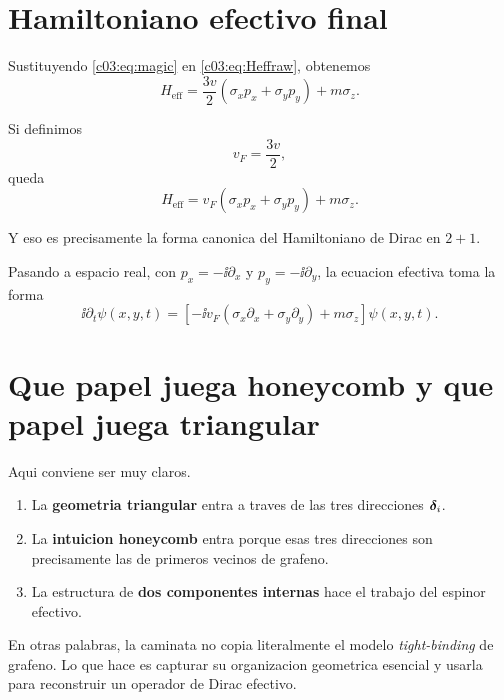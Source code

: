 \section{Hamiltoniano efectivo final}

Sustituyendo \eqref{c03:eq:magic} en \eqref{c03:eq:Heffraw}, obtenemos
\begin{equation}
H_{\text{eff}}
=
\frac{3v}{2}\left(\sigma_x p_x + \sigma_y p_y\right)+m\sigma_z.
\label{c03:eq:Hefffinal}
\end{equation}

Si definimos
\begin{equation}
v_F = \frac{3v}{2},
\end{equation}
queda
\begin{equation}
H_{\text{eff}}
=
v_F\left(\sigma_x p_x + \sigma_y p_y\right)+m\sigma_z.
\label{c03:eq:Diracfinal}
\end{equation}

Y eso es precisamente la forma canonica del Hamiltoniano de Dirac en \(2+1\).

Pasando a espacio real, con \(p_x=-\ii\partial_x\) y \(p_y=-\ii\partial_y\), la ecuacion efectiva toma la forma
\begin{equation}
\ii \partial_t \psi(x,y,t)
=
\left[
-\ii v_F\left(\sigma_x \partial_x + \sigma_y \partial_y\right)
+ m \sigma_z
\right]\psi(x,y,t).
\label{c03:eq:dirac21real}
\end{equation}

\section{Que papel juega honeycomb y que papel juega triangular}

Aqui conviene ser muy claros.

\begin{enumerate}[leftmargin=*]
  \item La \textbf{geometria triangular} entra a traves de las tres direcciones \(\bm{\delta}_i\).
  \item La \textbf{intuicion honeycomb} entra porque esas tres direcciones son precisamente las de primeros vecinos de grafeno.
  \item La estructura de \textbf{dos componentes internas} hace el trabajo del espinor efectivo.
\end{enumerate}

En otras palabras, la caminata no copia literalmente el modelo \emph{tight-binding} de grafeno. Lo que hace es capturar su organizacion geometrica esencial y usarla para reconstruir un operador de Dirac efectivo.

